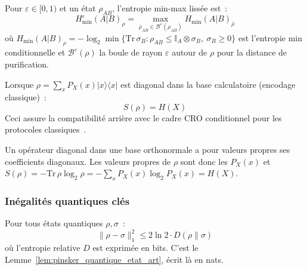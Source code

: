\begin{sloppypar}
\begin{definition}\label{def:entropie_min_max_lissee}
Pour $\varepsilon \in [0,1)$ et un \'etat $\rho_{AB}$, l'entropie min-max
liss\'ee est~:
\begin{equation}
H_{\min}^\varepsilon(A|B)_\rho = \max_{\bar{\rho}_{AB} \in \mathcal{B}^\varepsilon(\rho_{AB})}
H_{\min}(A|B)_{\bar{\rho}}
\end{equation}
o\`u $H_{\min}(A|B)_\rho = -\log_2 \min\{\mathrm{Tr}\,\sigma_B : \rho_{AB} \leq \mathbb{I}_A \otimes \sigma_B,\ \sigma_B \geq 0\}$
est l'entropie min conditionnelle et $\mathcal{B}^\varepsilon(\rho)$ la boule de
rayon $\varepsilon$ autour de $\rho$ pour la distance de purification.
\end{definition}

\begin{remark}\label{rem:relation_shannon}
Lorsque $\rho = \sum_x P_X(x) |x\rangle\langle x|$ est diagonal dans la base
calculatoire (encodage classique)~:
\begin{equation}
S(\rho) = H(X)
\end{equation}
Ceci assure la compatibilit\'e arri\`ere avec le cadre CRO conditionnel pour
les protocoles classiques~\cite{CoverThomas06,HanVerdu}.
\end{remark}

\begin{Preuve}
Un op\'erateur diagonal dans une base orthonormale a pour valeurs propres ses
coefficients diagonaux. Les valeurs propres de $\rho$ sont donc les $P_X(x)$ et
$S(\rho) = -\mathrm{Tr}\,\rho\log_2\rho = -\sum_x P_X(x)\log_2 P_X(x) = H(X)$.
\end{Preuve}

\subsubsection{In\'egalit\'es quantiques cl\'es}
\label{subsubsec:inegalites_quantiques}

\begin{lemma}\label{lem:pinsker_quantique}
Pour tous \'etats quantiques $\rho, \sigma$~:
\begin{equation}
\|\rho - \sigma\|_1^2 \leq 2 \ln 2 \cdot D(\rho\|\sigma)
\end{equation}
o\`u l'entropie relative $D$ est exprim\'ee en bits. C'est le
Lemme~\ref{lem:pinsker_quantique_etat_art}, \'ecrit l\`a en nats.
\end{lemma}


\end{sloppypar}
